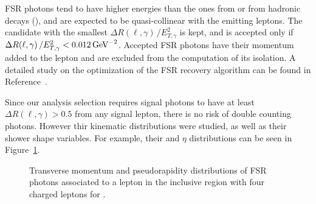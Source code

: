 FSR photons tend to have higher energies than the ones from \pileup{} or from hadronic decays (\eg \PGpz),
and are expected to be quasi-collinear with the emitting leptons.
The candidate with the smallest $\Delta R(\ell, \gamma)\, / E_{T,\gamma}^{2}$ is kept,
and is accepted only if $\Delta R(\ell, \gamma)\, / E_{T,\gamma}^{2} < 0.012 \,\text{Ge\hspace{-.08em}V}^{-2}$.
Accepted FSR photons have their momentum added to the lepton and are excluded from the computation of its isolation.
A detailed study on the optimization of the FSR recovery algorithm can be found in Reference~\cite{CMS-HIG-16-041}.

Since our analysis selection requires signal photons to have at least $\Delta R(\ell, \gamma) > 0.5$ from any signal lepton, there is no risk of double counting photons.
However thir kinematic distributions were studied, as well as their shower shape variables.
For example, their \pt and $\eta$ distributions can be seen in Figure~\ref{fig:distributions_fsrPhotons}.

\begin{figure}
  \centering
  \hfill
  \hfill
  \hfill\mbox{}
  \caption{Transverse momentum and pseudorapidity distributions of FSR photons associated to a lepton in the inclusive region with four charged leptons for \RunII.}
  \label{fig:distributions_fsrPhotons}
\end{figure}


